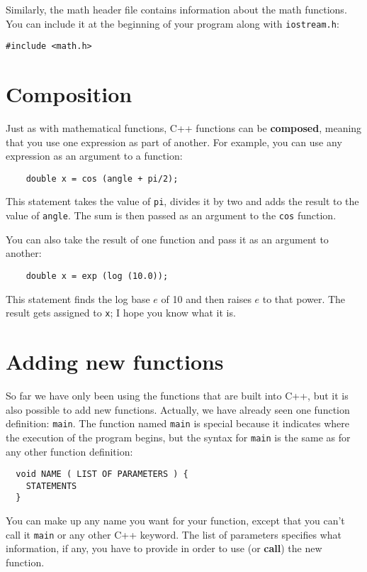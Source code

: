 Similarly, the math header file contains information
about the math functions.  You can include it at the beginning
of your program along with {\tt iostream.h}:

\begin{lstlisting}
#include <math.h>
\end{lstlisting}

\section {Composition}
\label{composition}

Just as with mathematical functions, C++ functions can be {\bf
composed}, meaning that you use one expression as part of another.
For example, you can use any expression as an argument to a function:

\begin{lstlisting}
    double x = cos (angle + pi/2);
\end{lstlisting}
%
This statement takes the value of {\tt pi}, divides it by two and
adds the result to the value of {\tt angle}.  The sum is
then passed as an argument to the {\tt cos} function.

You can also take the result of one function and pass it as
an argument to another:

\begin{lstlisting}
    double x = exp (log (10.0));
\end{lstlisting}
%
This
statement finds the log base $e$ of 10 and then raises $e$ to that
power.  The result gets assigned to {\tt x}; I hope you know what it
is.

\section{Adding new functions}

So far we have only been using the functions that are built into C++,
but it is also possible to add new functions.  Actually, we have already
seen one function definition: {\tt main}.  The function named {\tt main}
is special because it indicates where the execution of the program
begins, but the syntax for {\tt main} is the same as for any other
function definition:

\begin{lstlisting}
  void NAME ( LIST OF PARAMETERS ) {
    STATEMENTS
  }
\end{lstlisting}
%
You can make up any name you want for your function, except
that you can't call it {\tt main} or any other
C++ keyword.  The list of
parameters specifies what information, if any, you have to
provide in order to use (or {\bf call}) the new function.

